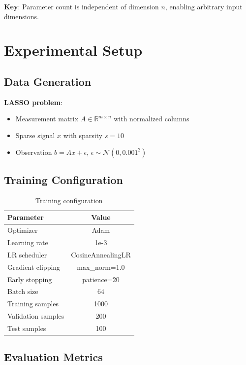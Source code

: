 \documentclass[11pt,a4paper]{article}
\begin{document}
\textbf{Key}: Parameter count is independent of dimension $n$, enabling arbitrary input dimensions.

\section{Experimental Setup}
\label{sec:setup}

\subsection{Data Generation}

\textbf{LASSO problem}:
\begin{itemize}
    \item Measurement matrix $A \in \mathbb{R}^{m \times n}$ with normalized columns
    \item Sparse signal $x$ with sparsity $s = 10$
    \item Observation $b = Ax + \epsilon$, $\epsilon \sim \mathcal{N}(0, 0.001^2)$
\end{itemize}

\subsection{Training Configuration}

\begin{table}[h]
\centering
\begin{tabular}{lc}
\toprule
\textbf{Parameter} & \textbf{Value} \\
\midrule
Optimizer & Adam \\
Learning rate & 1e-3 \\
LR scheduler & CosineAnnealingLR \\
Gradient clipping & max\_norm=1.0 \\
Early stopping & patience=20 \\
Batch size & 64 \\
Training samples & 1000 \\
Validation samples & 200 \\
Test samples & 100 \\
\bottomrule
\end{tabular}
\caption{Training configuration}
\label{tab:config}
\end{table}

\subsection{Evaluation Metrics}
\end{document}
